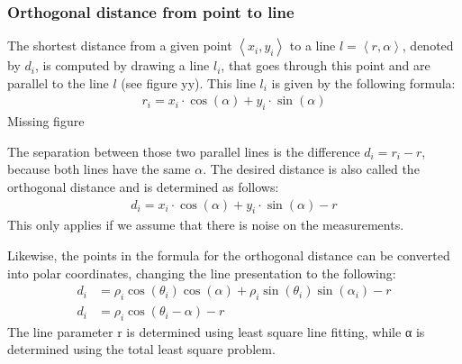 \documentclass[../Main.tex]{subfiles}
\begin{document}
\subsubsection{Orthogonal distance from point to line}
The shortest distance from a given point $\left\langle x_i, y_i \right\rangle$ to a line $l=\left\langle r, \alpha \right\rangle$, denoted by $d_i$, is computed by drawing a line $l_i$, that goes through this point and are parallel to the line $l$ (see figure yy).  This line $l_i$ is given by the following formula:
\begin{align}
    r_i = x_i\cdot\cos(\alpha)+y_i\cdot\sin(\alpha)
\end{align}
{\color{red} Missing figure} \par
The separation between those two parallel lines is the difference $d_i = r_i - r$, because both lines have the same $\alpha$. The desired distance is also called the orthogonal distance and is determined as follows:
\begin{align}
    d_i = x_i\cdot\cos(\alpha)+y_i\cdot\sin(\alpha) - r
\end{align}
This only applies if we assume that there is noise on the measurements.\par
Likewise, the points in the formula for the orthogonal distance can be converted into polar coordinates, changing the line presentation to the following:
\begin{align}
    d_i &= \rho_i\cos(\theta_i)\cos(\alpha) + \rho_i\sin(\theta_i)\sin(\alpha_i) - r \\
    d_i &= \rho_i\cos(\theta_i - \alpha) - r
\end{align}
The line parameter r is determined using least square line fitting, while α is determined using the total least square problem.   
\end{document}
